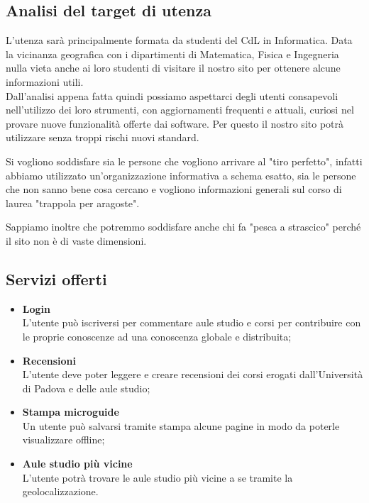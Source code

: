 \subsection{Analisi del target di utenza}

L'utenza sarà principalmente formata da studenti del CdL in Informatica. Data la vicinanza geografica con i dipartimenti di Matematica, Fisica e Ingegneria nulla vieta anche ai loro studenti di visitare il nostro sito per ottenere alcune informazioni utili.\\
Dall'analisi appena fatta quindi possiamo aspettarci degli utenti consapevoli nell'utilizzo dei loro strumenti, con aggiornamenti frequenti e attuali, curiosi nel provare nuove funzionalità offerte dai software. Per questo il nostro sito potrà utilizzare senza troppi rischi nuovi standard.

Si vogliono soddisfare sia le persone che vogliono arrivare al "tiro perfetto", infatti abbiamo utilizzato un'organizzazione informativa a schema esatto, sia le persone che non sanno bene cosa cercano e vogliono informazioni generali sul corso di laurea "trappola per aragoste".

Sappiamo inoltre che potremmo soddisfare anche chi fa "pesca a strascico" perché il sito non è di vaste dimensioni.

\subsection{Servizi offerti}
\begin{itemize}
    \item \textbf{Login} \\ L'utente può iscriversi per commentare aule studio e corsi per contribuire con le proprie conoscenze ad una conoscenza globale e distribuita;
    \item \textbf{Recensioni} \\L'utente deve poter leggere e creare recensioni dei corsi erogati dall'Università di Padova e delle aule studio;
    \item \textbf{Stampa microguide} \\ Un utente può salvarsi tramite stampa alcune pagine in modo da poterle visualizzare offline;
    \item \textbf{Aule studio più vicine} \\ L'utente potrà trovare le aule studio più vicine a se tramite la geolocalizzazione.
\end{itemize}